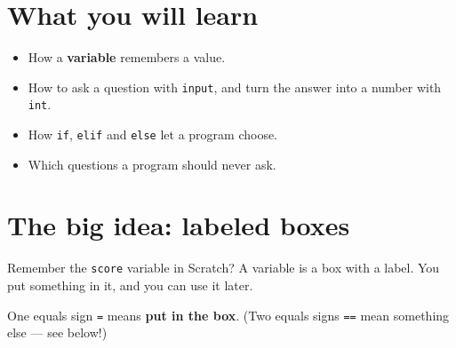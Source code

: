 
\section{What you will learn}
\begin{itemize}[leftmargin=1.2em,itemsep=1pt]
  \item How a \textbf{variable} remembers a value.
  \item How to ask a question with \texttt{input}, and turn the answer into a number with \texttt{int}.
  \item How \texttt{if}, \texttt{elif} and \texttt{else} let a program choose.
  \item Which questions a program should never ask.
\end{itemize}

\section{The big idea: labeled boxes}
Remember the \texttt{score} variable in Scratch? A variable is a box with a label. You put something in it, and you can use it later.
\begin{center}
\end{center}
One equals sign \texttt{=} means \textbf{put in the box}. (Two equals signs \texttt{==} mean something else --- see below!)

